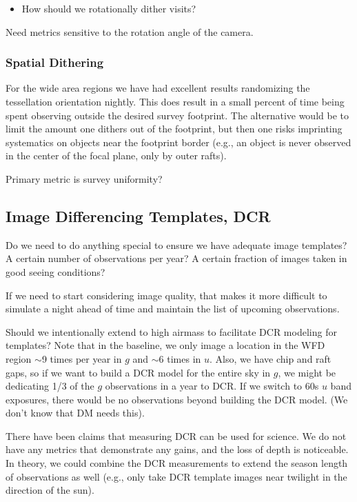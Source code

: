 \begin{itemize}
    \item{How should we rotationally dither visits?}
\end{itemize}

Need metrics sensitive to the rotation angle of the camera. 

\subsubsection{Spatial Dithering}

For the wide area regions we have had excellent results randomizing the tessellation orientation nightly. This does result in a small percent of time being spent observing outside the desired survey footprint. The alternative would be to limit the amount one dithers out of the footprint, but then one risks imprinting systematics on objects near the footprint border (e.g., an object is never observed in the center of the focal plane, only by outer rafts).

Primary metric is survey uniformity?


\subsection{Image Differencing Templates, DCR}

Do we need to do anything special to ensure we have adequate image templates? A certain number of observations per year? A certain fraction of images taken in good seeing conditions? 

If we need to start considering image quality, that makes it more difficult to simulate a night ahead of time and maintain the list of upcoming observations.

Should we intentionally extend to high airmass to facilitate DCR modeling for templates? Note that in the baseline, we only image a location in the WFD region $\sim$9 times per year in $g$ and $\sim$6 times in $u$. Also, we have chip and raft gaps, so if we want to build a DCR model for the entire sky in $g$, we might be dedicating 1/3 of the $g$ observations in a year to DCR. If we switch to 60s $u$ band exposures, there would be no observations beyond building the DCR model. (We don't know that DM needs this).

There have been claims that measuring DCR can be used for science.  We do not have any metrics that demonstrate any gains, and the loss of depth is noticeable. In theory, we could combine the DCR measurements to extend the season length of observations as well (e.g., only take DCR template images near twilight in the direction of the sun).


